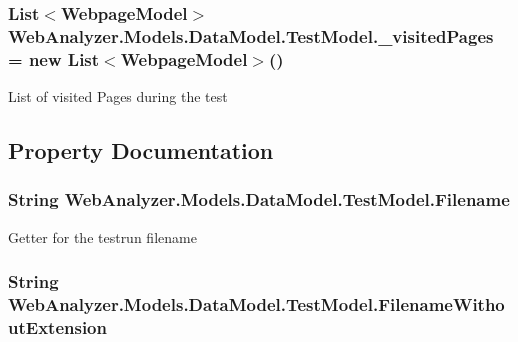 \subsubsection[{\+\_\+visited\+Pages}]{\setlength{\rightskip}{0pt plus 5cm}List$<${\bf Webpage\+Model}$>$ Web\+Analyzer.\+Models.\+Data\+Model.\+Test\+Model.\+\_\+visited\+Pages = new List$<${\bf Webpage\+Model}$>$()\hspace{0.3cm}{\ttfamily [private]}}\label{class_web_analyzer_1_1_models_1_1_data_model_1_1_test_model_a849d23a83d37ac0e965c3946d8085aa2}


List of visited Pages during the test 



\subsection{Property Documentation}
\hypertarget{class_web_analyzer_1_1_models_1_1_data_model_1_1_test_model_a4353d075e751f00ca785cf5702f00910}{}
\subsubsection[{Filename}]{\setlength{\rightskip}{0pt plus 5cm}String Web\+Analyzer.\+Models.\+Data\+Model.\+Test\+Model.\+Filename\hspace{0.3cm}{\ttfamily [get]}}\label{class_web_analyzer_1_1_models_1_1_data_model_1_1_test_model_a4353d075e751f00ca785cf5702f00910}


Getter for the testrun filename 

\hypertarget{class_web_analyzer_1_1_models_1_1_data_model_1_1_test_model_a91b896389e06b664e992c719f4d73e9b}{}
\subsubsection[{Filename\+Without\+Extension}]{\setlength{\rightskip}{0pt plus 5cm}String Web\+Analyzer.\+Models.\+Data\+Model.\+Test\+Model.\+Filename\+Without\+Extension\hspace{0.3cm}{\ttfamily [get]}}\label{class_web_analyzer_1_1_models_1_1_data_model_1_1_test_model_a91b896389e06b664e992c719f4d73e9b}


